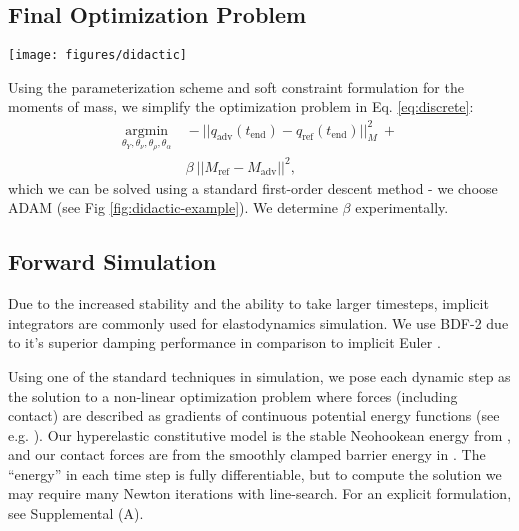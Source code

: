 \subsection{Final Optimization Problem}
%
\begin{figure*}[t]
	\centering
	\texttt{[image: figures/didactic]}
	\vspace{-0.7cm}
	\caption{Our differentiable physics simulator allows us to construct adversarial objects using a first order optimization method.}
	\label{fig:didactic-example}
\end{figure*}
Using the parameterization scheme and soft constraint formulation for the moments of mass, we simplify the optimization problem in Eq. \ref{eq:discrete}:
\begin{equation}
\label{eq:total-cost}
\begin{split}
	 \underset{\theta_Y, \theta_\nu, \theta_\rho, \theta_\alpha}{\mathrm{argmin}} &\  -|| q_\text{adv}(t_\text{end}) - q_\text{ref}(t_\text{end}) ||_M^2\ + \\%
	 \ &\  \beta \ || M_\text{ref} - M_\text{adv} ||^2,
\end{split}
\end{equation}
which we can be solved using a standard first-order descent method - we choose ADAM \cite{adam} (see Fig \ref{fig:didactic-example}). We determine $\beta$ experimentally. 

\subsection{Forward Simulation}
%
Due to the increased stability and the ability to take larger timesteps, implicit integrators are commonly used for elastodynamics simulation. We use BDF-2 due to it's superior damping performance in comparison to implicit Euler \cite{bdf2-book}.%

Using one of the standard techniques in simulation, we pose each dynamic step as the solution to a non-linear optimization problem where forces (including contact) are described as gradients of continuous potential energy functions (see e.g. \cite{ipc, implicit-newton}). Our hyperelastic constitutive model is the stable Neohookean energy from \citet{dynamic-deformables}, and our contact forces are from the smoothly clamped barrier energy in \citet{ipc}.
The ``energy'' in each time step is fully differentiable, but to compute the solution we may require many Newton iterations with line-search. For an explicit formulation, see Supplemental (A).

